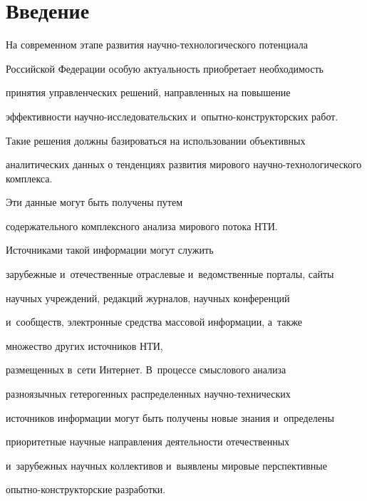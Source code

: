 







      \thispagestyle{headings}


      


\section{Введение}


      


     На современном этапе развития научно-технологического потенциала 


Российской Федерации особую актуальность приобретает необходимость 


принятия управленческих решений, направленных на повышение 


эффективности научно-ис\-сле\-до\-ва\-тель\-ских и~опытно-конструкторских работ. 


Такие решения должны базироваться на использовании объективных 


аналитических данных о тенденциях развития мирового научно-технологического комплекса. 


Эти данные могут быть получены путем 


содержательного комплексного анализа мирового потока НТИ. 


Источниками такой информации могут служить 


зарубежные и~отечественные отраслевые и~ведомственные порталы, сайты 


научных учреждений, редакций журналов, научных конференций 


и~сообществ, электронные средства массовой информации, а~также 


множество других источников НТИ, 


размещенных в~сети Интернет. В~процессе смыслового анализа 


разноязычных гетерогенных распределенных на\-уч\-но-тех\-ни\-че\-ских 


источников информации могут быть получены новые знания и~определены 


приоритетные научные направления деятельности отечественных 


и~зарубежных научных коллективов и~выявлены мировые перспективные 


опытно-кон\-ст\-рук\-тор\-ские разработки. 


